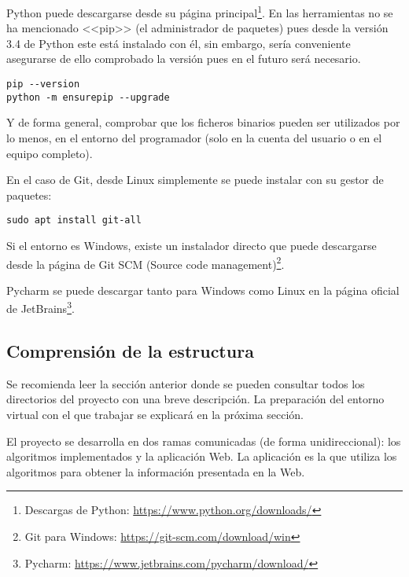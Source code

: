 Python puede descargarse desde su página principal\footnote{Descargas de
Python: \url{https://www.python.org/downloads/}}. En las herramientas no se ha
mencionado <<pip>> (el administrador de paquetes) pues desde la versión 3.4 de
Python este está instalado con él, sin embargo, sería conveniente asegurarse de
ello comprobado la versión pues en el futuro será necesario. 

\begin{tcolorbox}[colback=cyan!5!white,colframe=cyan!75!black,title=Comprobar pip]
\begin{verbatim}
pip --version 
python -m ensurepip --upgrade
\end{verbatim}
\end{tcolorbox}

Y de forma general, comprobar que los ficheros binarios pueden ser utilizados por lo
menos, en el entorno del programador (solo en la cuenta del usuario o en el equipo completo).

En el caso de Git, desde Linux simplemente se puede instalar con su gestor de
paquetes:

\begin{tcolorbox}[colback=cyan!5!white,colframe=cyan!75!black,title=Instalar Git en Linux]
\begin{verbatim}
sudo apt install git-all
\end{verbatim}
\end{tcolorbox}

Si el entorno es Windows, existe un instalador directo que puede descargarse
desde la página de Git SCM (Source code management)\footnote{Git para Windows:
\url{https://git-scm.com/download/win}}.

Pycharm se puede descargar tanto para Windows como Linux en la página oficial de
JetBrains\footnote{Pycharm: \url{https://www.jetbrains.com/pycharm/download/}}.

\subsection{Comprensión de la estructura}

Se recomienda leer la sección anterior donde se pueden consultar todos los
directorios del proyecto con una breve descripción. La preparación del entorno
virtual con el que trabajar se explicará en la próxima sección.

El proyecto se desarrolla en dos ramas comunicadas (de forma unidireccional):
los algoritmos implementados y la aplicación Web. La aplicación es la que
utiliza los algoritmos para obtener la información presentada en la Web.

